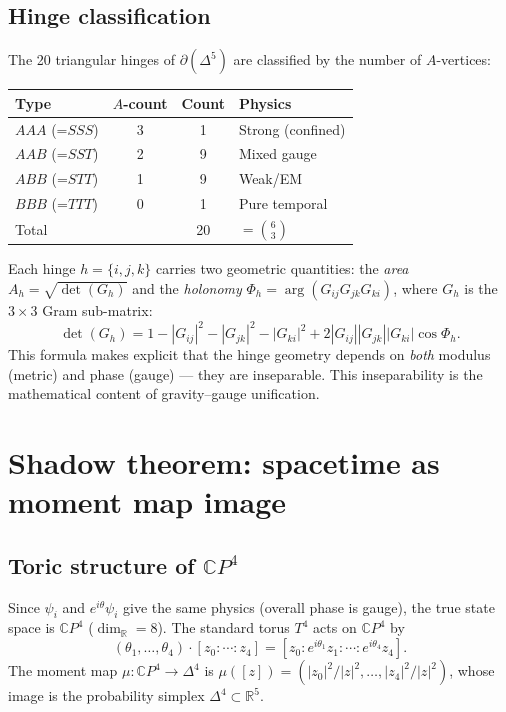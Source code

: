\documentclass[12pt,a4paper]{article}
\newcommand{\CP}{\mathbb{C}P}
\newcommand{\RR}{\mathbb{R}}
\begin{document}
\subsection{Hinge classification}

The 20 triangular hinges of $\partial(\Delta^5)$ are classified
by the number of $A$-vertices:

\begin{center}
\begin{tabular}{lccl}
\toprule
Type & $A$-count & Count & Physics \\
\midrule
$AAA$ (=$SSS$) & 3 & 1 & Strong (confined) \\
$AAB$ (=$SST$) & 2 & 9 & Mixed gauge \\
$ABB$ (=$STT$) & 1 & 9 & Weak/EM \\
$BBB$ (=$TTT$) & 0 & 1 & Pure temporal \\
\midrule
Total & & 20 & $= \binom{6}{3}$ \\
\bottomrule
\end{tabular}
\end{center}

Each hinge $h = \{i,j,k\}$ carries two geometric quantities:
the \emph{area} $A_h = \sqrt{\det(G_h)}$ and the
\emph{holonomy} $\Phi_h = \arg(G_{ij}G_{jk}G_{ki})$,
where $G_h$ is the $3\times 3$ Gram sub-matrix:
\begin{equation}
\label{eq:det}
\det(G_h) = 1 - |G_{ij}|^2 - |G_{jk}|^2 - |G_{ki}|^2
+ 2|G_{ij}||G_{jk}||G_{ki}|\cos\Phi_h.
\end{equation}
This formula makes explicit that the hinge geometry depends on
\emph{both} modulus (metric) and phase (gauge) --- they are
inseparable.  This inseparability is the mathematical content
of gravity--gauge unification.

\section{Shadow theorem: spacetime as moment map image}
\label{sec:shadow}

\subsection{Toric structure of $\CP^4$}

Since $\psi_i$ and $e^{i\theta}\psi_i$ give the same physics
(overall phase is gauge), the true state space is $\CP^4$
($\dim_\RR = 8$).  The standard torus $T^4$ acts on $\CP^4$ by
\begin{equation}
(\theta_1,\ldots,\theta_4)\cdot[z_0:\cdots:z_4]
= [z_0 : e^{i\theta_1}z_1 : \cdots : e^{i\theta_4}z_4].
\end{equation}
The moment map $\mu: \CP^4 \to \Delta^4$ is
$\mu([z]) = (|z_0|^2/|z|^2,\ldots,|z_4|^2/|z|^2)$,
whose image is the probability simplex $\Delta^4 \subset \RR^5$.
\end{document}
